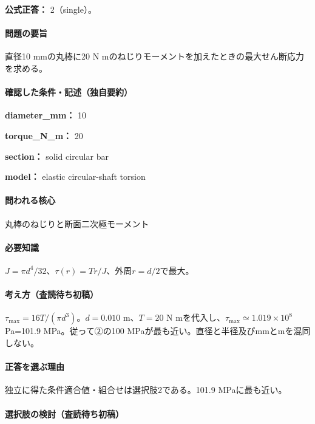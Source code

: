 \textbf{公式正答：} 2（single）。

\paragraph{問題の要旨} 直径10 mmの丸棒に20 N mのねじりモーメントを加えたときの最大せん断応力を求める。

\paragraph{確認した条件・記述（独自要約）}\mbox{}\par

\noindent\textbf{diameter\_mm：} 10\par

\noindent\textbf{torque\_N\_m：} 20\par

\noindent\textbf{section：} solid circular bar\par

\noindent\textbf{model：} elastic circular-shaft torsion\par

\paragraph{問われる核心} 丸棒のねじりと断面二次極モーメント

\paragraph{必要知識} \(J=\pi d^4/32\)、\(\tau(r)=Tr/J\)、外周\(r=d/2\)で最大。

\paragraph{考え方（査読待ち初稿）} \(\tau_{\max}=16T/(\pi d^3)\)。\(d=0.010\) m、\(T=20\) N mを代入し、\(\tau_{\max}\simeq1.019\times10^8\) Pa=\allowbreak{}101.9 MPa。従って②の100 MPaが最も近い。直径と半径及びmmとmを混同しない。

\paragraph{正答を選ぶ理由} 独立に得た条件適合値・組合せは選択肢2である。101.9 MPaに最も近い。

\paragraph{選択肢の検討（査読待ち初稿）}\mbox{}\par

